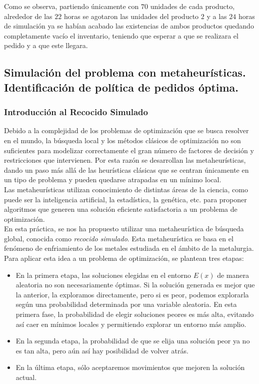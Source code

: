 \documentclass[a4paper,12pt]{article}
\begin{document}
	Como se observa, partiendo únicamente con $70$ unidades de cada producto, alrededor de las $22$ 	horas se agotaron las unidades del producto $2$ y a las $24$ horas de simulación ya se habían acabado las existencias de ambos productos quedando completamente vacío el inventario, teniendo que	esperar a que se realizara el pedido y a que este llegara.

	\subsection{Simulación del problema con metaheurísticas. Identificación de política de pedidos óptima.}
	
	\subsubsection{Introducción al Recocido Simulado}
	
	Debido a la complejidad de los problemas de optimización que se busca resolver en el mundo, la búsqueda local y los métodos clásicos de optimización no son suficientes para modelizar correctamente el gran número de factores de decisión y restricciones que intervienen. Por esta razón se desarrollan las metaheurísticas, dando un paso más allá de las heurísticas clásicas que se centran únicamente en un tipo de problema y pueden quedarse atrapadas en un mínimo local.\\
	
	Las metaheurísticas	utilizan conocimiento de distintas áreas de la ciencia, como puede ser la inteligencia artificial, la estadística, la genética, etc. para proponer algoritmos que generen una solución eficiente  satisfactoria a un problema de optimización.\\
	
	En esta práctica, se nos ha propuesto utilizar una metaheurística de búsqueda global, conocida como \textit{recocido simulado}. Esta metaheurística se basa en el fenómeno de enfriamiento de los metales estudiada en el ámbito de la metalurgia. \\
	
	Para aplicar esta idea a un problema de optimización, se plantean tres etapas:
	\begin{itemize}
		\item En la primera etapa, las soluciones elegidas en el entorno $E(x)$ de manera aleatoria no son necesariamente óptimas. Si la solución generada es mejor que la anterior, la exploramos directamente, pero si es peor, podemos explorarla según una probabilidad determinada por una variable aleatoria. En esta primera fase, la probabilidad de elegir soluciones peores es más alta, evitando así caer en mínimos locales y permitiendo explorar un entorno más amplio.
		\item En la segunda etapa, la probabilidad de que se elija una solución peor ya no es tan alta, pero aún así hay posibilidad de volver atrás.
		\item En la última etapa, sólo aceptaremos movimientos que mejoren la solución actual.
	\end{itemize}
	
\end{document}

